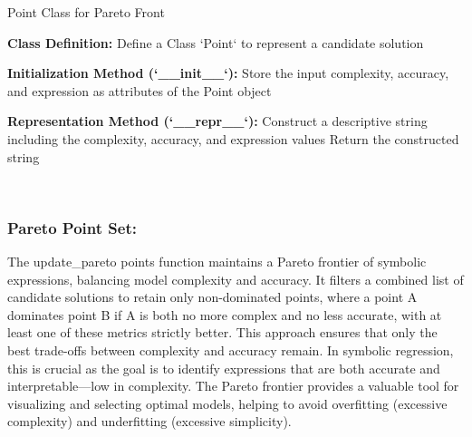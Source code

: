 \documentclass{article}
\begin{document}
\begin{algorithm}[H]
\SetAlgoLined %
\caption{Point Class for Pareto Front}
\label{alg:point_class} %

\textbf{Class Definition:}\;
Define a Class `Point` to represent a candidate solution\;

\textbf{Initialization Method (`__init__`):}\;
\;
Store the input complexity, accuracy, and expression as attributes of the Point object\;

\textbf{Representation Method (`__repr__`):}\;
\;
Construct a descriptive string including the complexity, accuracy, and expression values\;
Return the constructed string\;

\end{algorithm}\\



\subsubsection{Pareto Point Set:}


The update\_pareto points function maintains a Pareto frontier of symbolic expressions, balancing model complexity and accuracy. It filters a combined list of candidate solutions to retain only non-dominated points, where a point A dominates point B if A is both no more complex and no less accurate, with at least one of these metrics strictly better. This approach ensures that only the best trade-offs between complexity and accuracy remain. In symbolic regression, this is crucial as the goal is to identify expressions that are both accurate and interpretable—low in complexity. The Pareto frontier provides a valuable tool for visualizing and selecting optimal models, helping to avoid overfitting (excessive complexity) and underfitting (excessive simplicity).\\
\end{document}
